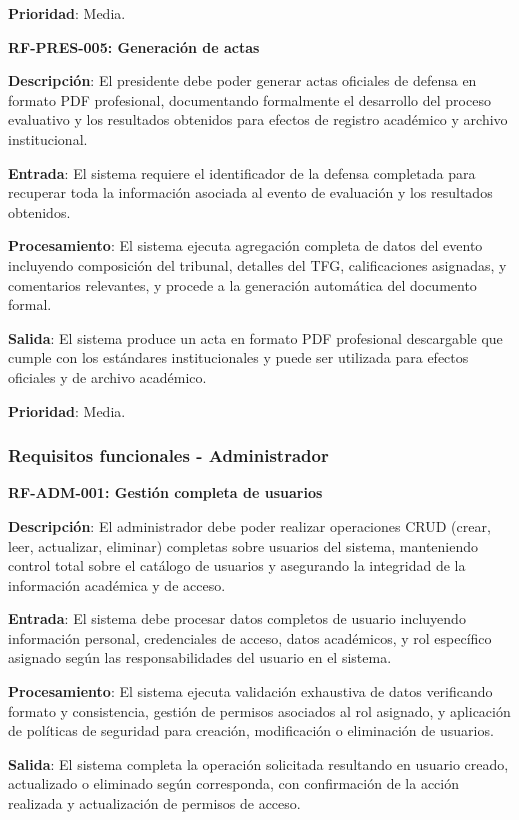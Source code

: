 \documentclass[12pt,a4paper,oneside]{report}
\begin{document}
\textbf{Prioridad}: Media.

\textbf{RF-PRES-005: Generación de actas}

\textbf{Descripción}: El presidente debe poder generar actas oficiales de defensa en formato PDF profesional, documentando formalmente el desarrollo del proceso evaluativo y los resultados obtenidos para efectos de registro académico y archivo institucional.

\textbf{Entrada}: El sistema requiere el identificador de la defensa completada para recuperar toda la información asociada al evento de evaluación y los resultados obtenidos.

\textbf{Procesamiento}: El sistema ejecuta agregación completa de datos del evento incluyendo composición del tribunal, detalles del TFG, calificaciones asignadas, y comentarios relevantes, y procede a la generación automática del documento formal.

\textbf{Salida}: El sistema produce un acta en formato PDF profesional descargable que cumple con los estándares institucionales y puede ser utilizada para efectos oficiales y de archivo académico.

\textbf{Prioridad}: Media.

\subsubsection{Requisitos funcionales -
Administrador}\label{requisitos-funcionales---administrador}

\textbf{RF-ADM-001: Gestión completa de usuarios}

\textbf{Descripción}: El administrador debe poder realizar operaciones CRUD (crear, leer, actualizar, eliminar) completas sobre usuarios del sistema, manteniendo control total sobre el catálogo de usuarios y asegurando la integridad de la información académica y de acceso.

\textbf{Entrada}: El sistema debe procesar datos completos de usuario incluyendo información personal, credenciales de acceso, datos académicos, y rol específico asignado según las responsabilidades del usuario en el sistema.

\textbf{Procesamiento}: El sistema ejecuta validación exhaustiva de datos verificando formato y consistencia, gestión de permisos asociados al rol asignado, y aplicación de políticas de seguridad para creación, modificación o eliminación de usuarios.

\textbf{Salida}: El sistema completa la operación solicitada resultando en usuario creado, actualizado o eliminado según corresponda, con confirmación de la acción realizada y actualización de permisos de acceso.
\end{document}
